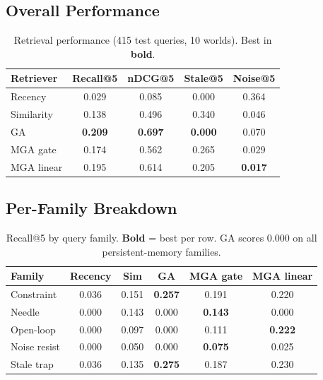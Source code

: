 \documentclass{article}
\begin{document}
\subsection{Overall Performance}

\begin{table}[ht]
\centering
\caption{Retrieval performance (415 test queries, 10 worlds). Best in \textbf{bold}.}
\vspace{0.5em}
\begin{tabular}{lcccc}
\toprule
\textbf{Retriever} & \textbf{Recall@5} & \textbf{nDCG@5} & \textbf{Stale@5} & \textbf{Noise@5} \\
\midrule
Recency & 0.029 & 0.085 & 0.000 & 0.364 \\
Similarity & 0.138 & 0.496 & 0.340 & 0.046 \\
GA & \textbf{0.209} & \textbf{0.697} & \textbf{0.000} & 0.070 \\
MGA gate & 0.174 & 0.562 & 0.265 & 0.029 \\
MGA linear & 0.195 & 0.614 & 0.205 & \textbf{0.017} \\
\bottomrule
\end{tabular}
\end{table}

\subsection{Per-Family Breakdown}

\begin{table}[ht]
\centering
\caption{Recall@5 by query family. \textbf{Bold} = best per row. GA scores 0.000 on all persistent-memory families.}
\vspace{0.5em}
\begin{tabular}{lccccc}
\toprule
\textbf{Family} & \textbf{Recency} & \textbf{Sim} & \textbf{GA} & \textbf{MGA gate} & \textbf{MGA linear} \\
\midrule
Constraint & 0.036 & 0.151 & \textbf{0.257} & 0.191 & 0.220 \\
Needle & 0.000 & 0.143 & 0.000 & \textbf{0.143} & 0.000 \\
Open-loop & 0.000 & 0.097 & 0.000 & 0.111 & \textbf{0.222} \\
Noise resist & 0.000 & 0.050 & 0.000 & \textbf{0.075} & 0.025 \\
Stale trap & 0.036 & 0.135 & \textbf{0.275} & 0.187 & 0.230 \\
\bottomrule
\end{tabular}
\end{table}
\end{document}
